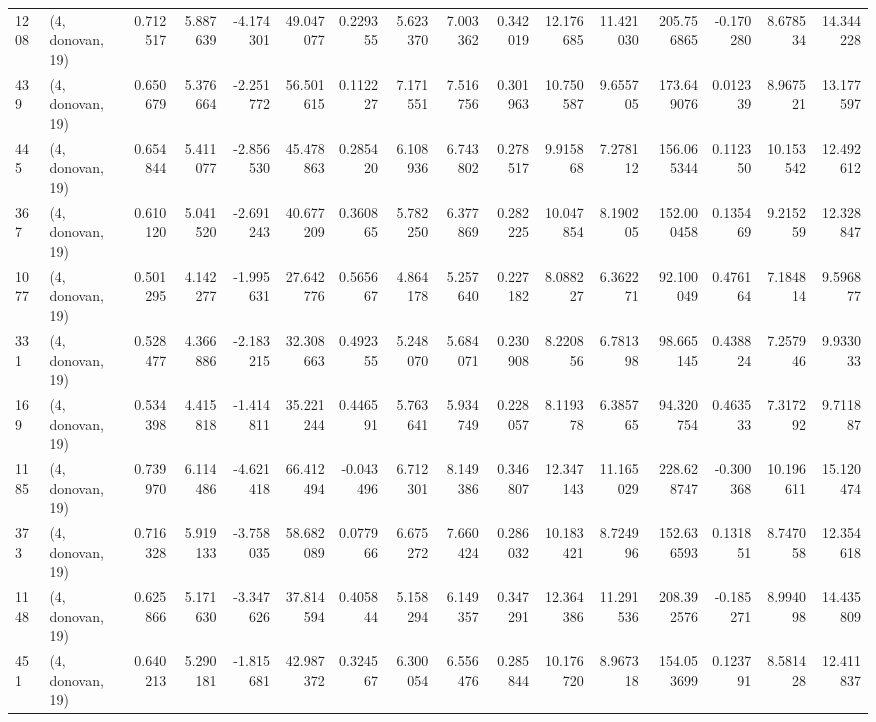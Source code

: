 \begin{tabular}{llrrrrrrrrrrrrrr}
1208 &  (4, donovan, 19) &   0.712517 &   5.887639 &  -4.174301 &     49.047077 &    0.229355 &    5.623370 &    7.003362 &  0.342019 &  12.176685 &  11.421030 &   205.756865 &  -0.170280 &   8.678534 &  14.344228 \\
439  &  (4, donovan, 19) &   0.650679 &   5.376664 &  -2.251772 &     56.501615 &    0.112227 &    7.171551 &    7.516756 &  0.301963 &  10.750587 &   9.655705 &   173.649076 &   0.012339 &   8.967521 &  13.177597 \\
445  &  (4, donovan, 19) &   0.654844 &   5.411077 &  -2.856530 &     45.478863 &    0.285420 &    6.108936 &    6.743802 &  0.278517 &   9.915868 &   7.278112 &   156.065344 &   0.112350 &  10.153542 &  12.492612 \\
367  &  (4, donovan, 19) &   0.610120 &   5.041520 &  -2.691243 &     40.677209 &    0.360865 &    5.782250 &    6.377869 &  0.282225 &  10.047854 &   8.190205 &   152.000458 &   0.135469 &   9.215259 &  12.328847 \\
1077 &  (4, donovan, 19) &   0.501295 &   4.142277 &  -1.995631 &     27.642776 &    0.565667 &    4.864178 &    5.257640 &  0.227182 &   8.088227 &   6.362271 &    92.100049 &   0.476164 &   7.184814 &   9.596877 \\
331  &  (4, donovan, 19) &   0.528477 &   4.366886 &  -2.183215 &     32.308663 &    0.492355 &    5.248070 &    5.684071 &  0.230908 &   8.220856 &   6.781398 &    98.665145 &   0.438824 &   7.257946 &   9.933033 \\
169  &  (4, donovan, 19) &   0.534398 &   4.415818 &  -1.414811 &     35.221244 &    0.446591 &    5.763641 &    5.934749 &  0.228057 &   8.119378 &   6.385765 &    94.320754 &   0.463533 &   7.317292 &   9.711887 \\
1185 &  (4, donovan, 19) &   0.739970 &   6.114486 &  -4.621418 &     66.412494 &   -0.043496 &    6.712301 &    8.149386 &  0.346807 &  12.347143 &  11.165029 &   228.628747 &  -0.300368 &  10.196611 &  15.120474 \\
373  &  (4, donovan, 19) &   0.716328 &   5.919133 &  -3.758035 &     58.682089 &    0.077966 &    6.675272 &    7.660424 &  0.286032 &  10.183421 &   8.724996 &   152.636593 &   0.131851 &   8.747058 &  12.354618 \\
1148 &  (4, donovan, 19) &   0.625866 &   5.171630 &  -3.347626 &     37.814594 &    0.405844 &    5.158294 &    6.149357 &  0.347291 &  12.364386 &  11.291536 &   208.392576 &  -0.185271 &   8.994098 &  14.435809 \\
451  &  (4, donovan, 19) &   0.640213 &   5.290181 &  -1.815681 &     42.987372 &    0.324567 &    6.300054 &    6.556476 &  0.285844 &  10.176720 &   8.967318 &   154.053699 &   0.123791 &   8.581428 &  12.411837 \\

\end{tabular}

